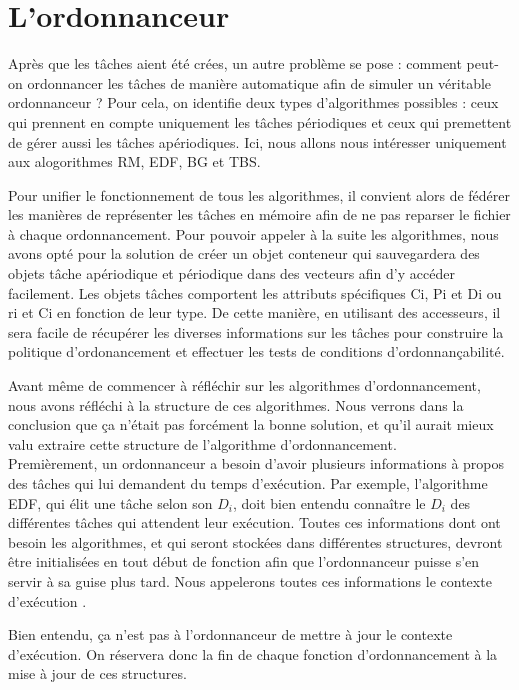 	\section{L'ordonnanceur}
		Après que les tâches aient été crées, un autre problème se pose : comment peut-on ordonnancer les tâches de manière automatique afin de simuler un véritable ordonnanceur ? Pour cela, on identifie deux types d'algorithmes possibles : ceux qui prennent en compte uniquement les tâches périodiques et ceux qui premettent de gérer aussi les tâches apériodiques. Ici, nous allons nous intéresser uniquement aux alogorithmes RM, EDF, BG et TBS.
		
		Pour unifier le fonctionnement de tous les algorithmes, il convient alors de fédérer les manières de représenter les tâches en mémoire afin de ne pas reparser le fichier à chaque ordonnancement. Pour pouvoir appeler à la suite les algorithmes, nous avons opté pour la solution de créer un objet conteneur qui sauvegardera des objets tâche apériodique et périodique dans des vecteurs afin d'y accéder facilement.
		Les objets tâches comportent les attributs spécifiques Ci, Pi et Di ou ri et Ci en fonction de leur type. De cette manière, en utilisant des accesseurs, il sera facile de récupérer les diverses informations sur les tâches pour construire la politique d'ordonancement et effectuer les tests de conditions d'ordonnançabilité.

		Avant même de commencer à réfléchir sur les algorithmes d'ordonnancement, nous avons réfléchi à la structure de ces algorithmes. Nous verrons dans la conclusion que ça n'était pas forcément la bonne solution, et qu'il aurait mieux valu extraire cette structure de l'algorithme d'ordonnancement.\\
		
		Premièrement, un ordonnanceur a besoin d'avoir plusieurs informations à propos des tâches qui lui demandent du temps d'exécution. Par exemple, l'algorithme EDF, qui élit une tâche selon son $D_i$, doit bien entendu connaître le $D_i$ des différentes tâches qui attendent leur exécution. Toutes ces informations dont ont besoin les algorithmes, et qui seront stockées dans différentes structures, devront être initialisées en tout début de fonction afin que l'ordonnanceur puisse s'en servir à sa guise plus tard. Nous appelerons toutes ces informations le \og contexte d'exécution \fg.
		
		Bien entendu, ça n'est pas à l'ordonnanceur de mettre à jour le contexte d'exécution. On réservera donc la fin de chaque fonction d'ordonnancement à la mise à jour de ces structures.
		
